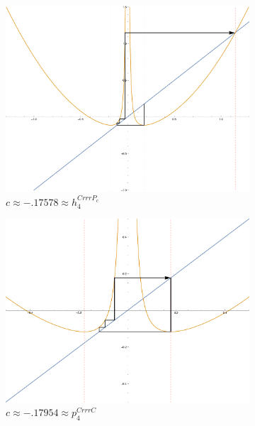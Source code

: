 \begin{figure}[ht]
		\begin{subfigure}[b]{0.3\textwidth}
				\includegraphics[width=\textwidth]{./img/plot-017578}
				\caption{$c \approx -.17578 \approx h_4^{CrrrP_c}$}
		\end{subfigure}
		\begin{subfigure}[b]{0.3\textwidth}
				\includegraphics[width=\textwidth]{./img/plot-017954}
				\caption{$c \approx - .17954 \approx p_4^{CrrrC}$}
		\end{subfigure}
		\begin{subfigure}[b]{0.3\textwidth}

\end{subfigure}
\end{figure}
